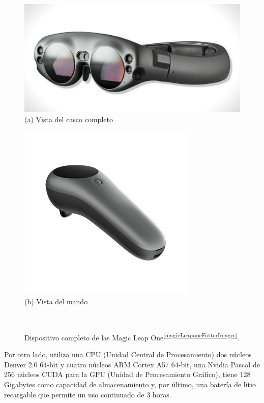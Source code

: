 \begin{figure}[htbp]
\centering
    \hspace{-4mm}
    \begin{minipage}{0.5\textwidth}
        \centering
        \includegraphics[scale=0.8]{Images/Estado del arte/magicleapone1.jpg}\\
        (a) Vista del casco completo
    \end{minipage}
    \begin{minipage}{0.5\textwidth}
        \centering
        \includegraphics[scale=0.3]{Images/Estado del arte/magicleapone2.jpg}\\
       (b) Vista del mando
    \end{minipage}\\
    \caption{Dispositivo completo de las Magic Leap One\textsuperscript{\ref{magicLeaponeFotterImages}}.}
    \label{fig:vistasMagicLeapnOne}
\end{figure}

Por otro lado, utiliza una CPU (Unidad Central de Procesamiento) dos núcleos Denver 2.0 64-bit y cuatro núcleos ARM Cortex A57 64-bit, una Nvidia Pascal de 256 núcleos CUDA para la GPU (Unidad de Procesamiento Gráfico), tiene 128 Gigabytes como capacidad de almacenamiento y, por último, una batería de litio recargable que permite un uso continuado de 3 horas. 


